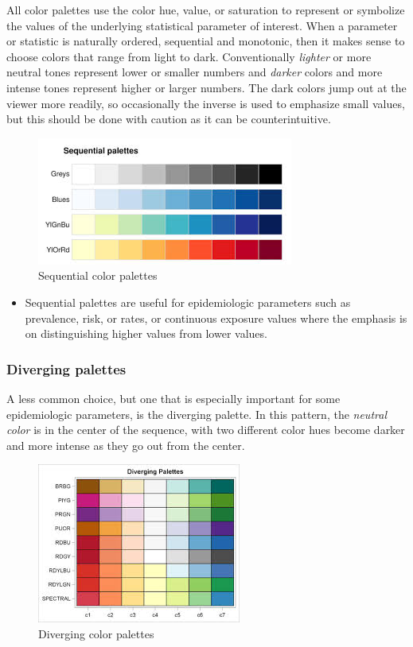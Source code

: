 \documentclass[
]{book}
\newenvironment{rmdblock}[1]
  {%
  \begin{itemize}
  \renewcommand{\labelitemi}{
    \raisebox{-.7\height}[0pt][0pt]{
      {\setkeys{Gin}{width=3em,keepaspectratio}\texttt{[image: images/\#1]}}
    }
  }
  \item
  }
  {
  \end{itemize}
  }
\newenvironment{rmdnote}
  {\begin{rmdblock}{note}}
  {\end{rmdblock}}
\begin{document}
All color palettes use the color hue, value, or saturation to represent or symbolize the values of the underlying statistical parameter of interest. When a parameter or statistic is naturally ordered, sequential and monotonic, then it makes sense to choose colors that range from light to dark. Conventionally \emph{lighter} or more neutral tones represent lower or smaller numbers and \emph{darker} colors and more intense tones represent higher or larger numbers. The dark colors jump out at the viewer more readily, so occasionally the inverse is used to emphasize small values, but this should be done with caution as it can be counterintuitive.

\begin{figure}
\centering
\includegraphics{images/palette-sequential.png}
\caption{\label{fig:unnamed-chunk-29}Sequential color palettes}
\end{figure}

\begin{rmdnote}
Sequential palettes are useful for epidemiologic parameters such as prevalence, risk, or rates, or continuous exposure values where the emphasis is on distinguishing higher values from lower values.
\end{rmdnote}

\hypertarget{diverging-palettes}{%
\subsubsection{Diverging palettes}\label{diverging-palettes}}

A less common choice, but one that is especially important for some epidemiologic parameters, is the diverging palette. In this pattern, the \emph{neutral color} is in the center of the sequence, with two different color hues become darker and more intense as they go out from the center.

\begin{figure}
\centering
\includegraphics{images/palette-diverging.png}
\caption{\label{fig:unnamed-chunk-31}Diverging color palettes}
\end{figure}
\end{document}
